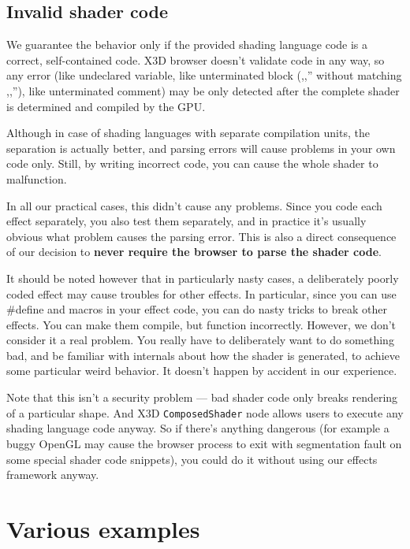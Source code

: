 \documentclass{acmsiggraph}                     %
\begin{document}
\subsection{Invalid shader code}

We guarantee the behavior only if the provided shading language code
is a correct, self-contained code.
X3D browser doesn't validate code in any way, so any error (like undeclared
variable, like unterminated block (,,{'' without matching ,,}''),
like unterminated comment) may be only detected after the complete shader
is determined and compiled by the GPU.

Although in case of shading languages with separate compilation units,
the separation is actually better, and parsing errors will cause
problems in your own code only. Still, by writing incorrect code,
you can cause the whole shader to malfunction.

In all our practical cases, this didn't cause any problems.
Since you code each effect separately, you also test them separately,
and in practice it's usually obvious what problem causes the parsing error.
This is also a direct consequence of our decision to \textbf{never require
the browser to parse the shader code}.

It should be noted however that in particularly nasty cases,
a deliberately poorly coded effect may cause troubles for other effects.
In particular, since you can use \#define and macros in your effect code,
you can do nasty tricks to break other effects. You can make them compile,
but function incorrectly. However, we don't consider
it a real problem. You really have to deliberately want to do something bad,
and be familiar with internals about how the shader is generated,
to achieve some particular weird behavior.
It doesn't happen by accident in our experience.

Note that this isn't a security problem --- bad shader code only breaks
rendering of a particular shape. And X3D \texttt{ComposedShader} node allows users
to execute any shading language code anyway. So if there's anything dangerous
(for example a buggy OpenGL may cause the browser process to exit with
segmentation fault on some special shader code snippets),
you could do it without using our effects framework anyway.

\section{Various examples}
\end{document}
